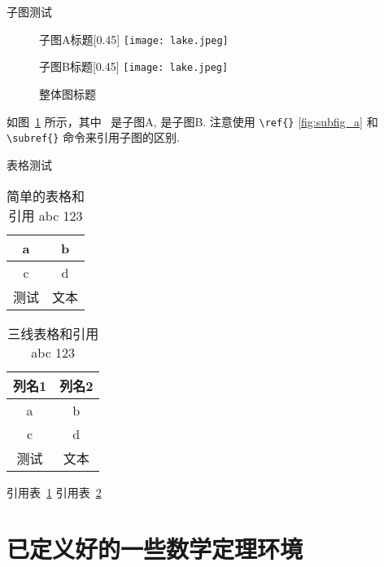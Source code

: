 子图测试
\begin{figure}[htbp]
    \centering

    \begin{subcaptionbox}{子图A标题\label{fig:subfig_a}\the\baselineskip}[0.45\textwidth]
        {\texttt{[image: lake.jpeg]}}
    \end{subcaptionbox}
    \hfill
    \begin{subcaptionbox}{子图B标题\label{fig:subfig_b}}[0.45\textwidth]
        {\texttt{[image: lake.jpeg]}}
    \end{subcaptionbox}

    \caption{整体图标题\the\baselineskip}
    \label{fig:subfigtest}
\end{figure}

如图~\ref{fig:subfigtest} 所示，其中~ 是子图A,  是子图B.
注意使用 \verb|\ref{}| \ref{fig:subfig_a} 和 \verb|\subref{}| 命令来引用子图的区别.


表格测试
\begin{table}[ht]
    \centering
    \caption{%
        简单的表格和引用 abc 123 %
    }
    \label{table:简单的表格}
    \begin{tabular}{cc}
        \hline
        a  & b  \\ \hline
        c  & d  \\ \hline
        测试 & 文本 \\ \hline
    \end{tabular}
\end{table}

\begin{table}[ht]
    \centering
    \caption{%
        三线表格和引用 abc 123 %
    }
    \label{table:三线表格}
    \begin{tabular}{cc}
        \toprule
        列名1 & 列名2 \\ \midrule
        a   & b   \\
        c   & d   \\
        测试  & 文本  \\ \bottomrule
    \end{tabular}
\end{table}

引用表~\ref{table:简单的表格}
引用表~\ref{table:三线表格}



\section{已定义好的一些数学定理环境}

